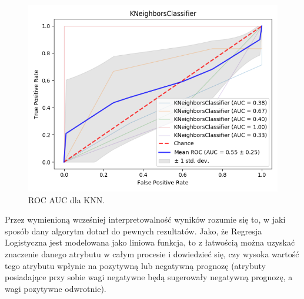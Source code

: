 \documentclass[a4paper,twoside,12pt]{book}
\begin{document}
\begin{description}
\begin{figure}[h!]
    \includegraphics[width=\textwidth]{images/knn.png}
    \caption{ROC AUC dla KNN.\protect\footnotemark}
    \label{fig:plot_knn}
\end{figure}

Przez wymienioną wcześniej interpretowalność wyników rozumie się to, w jaki sposób dany algorytm dotarł do pewnych rezultatów. Jako, że Regresja Logistyczna jest modelowana jako liniowa funkcja, to z łatwością można uzyskać znaczenie danego atrybutu w całym procesie i dowiedzieć się, czy wysoka wartość tego atrybutu wpłynie na pozytywną lub negatywną prognozę (atrybuty posiadające przy sobie wagi negatywne będą sugerowały negatywną prognozę, a wagi pozytywne odwrotnie). 



\end{description}
\end{document}

